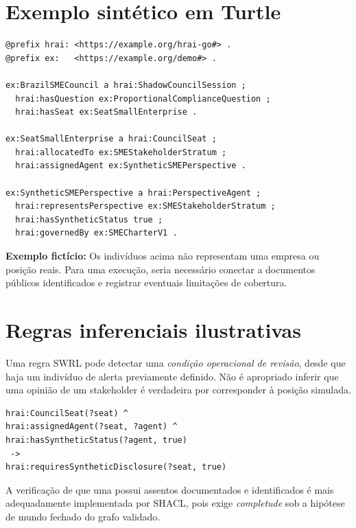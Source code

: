 \documentclass[12pt,a4paper,oneside,english,brazil]{abntex2}
\newcommand{\term}[1]{{\mdseries\ttfamily\small\seqsplit{#1}}}
\newcommand{\nexample}{\textbf{Exemplo fictício:} }
\begin{document}
\section{Exemplo sintético em Turtle}
\begin{lstlisting}
@prefix hrai: <https://example.org/hrai-go#> .
@prefix ex:   <https://example.org/demo#> .

ex:BrazilSMECouncil a hrai:ShadowCouncilSession ;
  hrai:hasQuestion ex:ProportionalComplianceQuestion ;
  hrai:hasSeat ex:SeatSmallEnterprise .

ex:SeatSmallEnterprise a hrai:CouncilSeat ;
  hrai:allocatedTo ex:SMEStakeholderStratum ;
  hrai:assignedAgent ex:SyntheticSMEPerspective .

ex:SyntheticSMEPerspective a hrai:PerspectiveAgent ;
  hrai:representsPerspective ex:SMEStakeholderStratum ;
  hrai:hasSyntheticStatus true ;
  hrai:governedBy ex:SMECharterV1 .
\end{lstlisting}
\nexample Os indivíduos acima não representam uma empresa ou posição reais. Para uma execução, seria necessário conectar \term{SMECharterV1} a documentos públicos identificados e registrar eventuais limitações de cobertura.

\section{Regras inferenciais ilustrativas}
Uma regra SWRL pode detectar uma \textit{condição operacional de revisão}, desde que haja um indivíduo de alerta previamente definido. Não é apropriado inferir que uma opinião de um stakeholder é verdadeira por corresponder à posição simulada.
\begin{lstlisting}
hrai:CouncilSeat(?seat) ^
hrai:assignedAgent(?seat, ?agent) ^
hrai:hasSyntheticStatus(?agent, true)
 ->
hrai:requiresSyntheticDisclosure(?seat, true)
\end{lstlisting}
A verificação de que uma \term{CouncilSession} possui assentos documentados e identificados é mais adequadamente implementada por SHACL, pois exige \emph{completude} sob a hipótese de mundo fechado do grafo validado.
\end{document}

